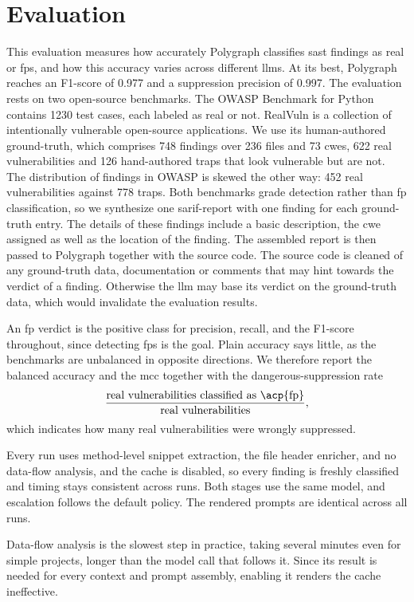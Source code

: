 \section{Evaluation}

This evaluation measures how accurately Polygraph classifies \ac{sast} findings as real or \acp{fp}, and how this accuracy varies across different \acp{llm}. At its best, Polygraph reaches an F1-score of 0.977 and a suppression precision of 0.997. The evaluation rests on two open-source benchmarks. The OWASP Benchmark for Python
\cite{owaspbenchmark} contains 1230 test cases, each labeled as real or not.
RealVuln \cite{realvuln} is a collection of intentionally
vulnerable open-source applications. We use its human-authored ground-truth, which comprises 748
findings over 236 files and 73 \acp{cwe}, 622 real vulnerabilities and
126 hand-authored traps that look vulnerable but are not. The distribution of findings in
OWASP is skewed the other way: 452 real vulnerabilities against 778 traps.
Both benchmarks grade detection rather than \ac{fp} classification, so we synthesize one \ac{sarif}-report with one finding for each ground-truth entry. The details of these findings include a basic description, the \ac{cwe} assigned as well as the location of the finding. The assembled report is then passed to Polygraph together with the source code. The source code is cleaned of any ground-truth data, documentation or comments that may hint towards the verdict of a finding. Otherwise the \ac{llm} may base its verdict on the ground-truth data, which would invalidate the evaluation results.

An \ac{fp} verdict is the positive class for precision, recall,
and the F1-score throughout, since detecting \acp{fp} is the goal. Plain
accuracy says little, as the benchmarks are unbalanced in opposite directions.
We therefore report the balanced accuracy and the \ac{mcc}
together with the dangerous-suppression rate
\[
  \frac{\text{real vulnerabilities classified as \acp{fp}}}{\text{real vulnerabilities}},
\]
which indicates how many real vulnerabilities were wrongly suppressed.

Every run uses method-level snippet extraction, the file header enricher, and
no data-flow analysis, and the cache is disabled, so every finding is freshly
classified and timing stays consistent across runs. Both stages use the same model, and escalation follows the
default policy. The rendered prompts are identical across all runs.

Data-flow analysis is the slowest step in practice, taking several minutes even for simple projects,
longer than the model call that follows it. Since its result is needed for
every context and prompt assembly, enabling it renders the cache ineffective.

